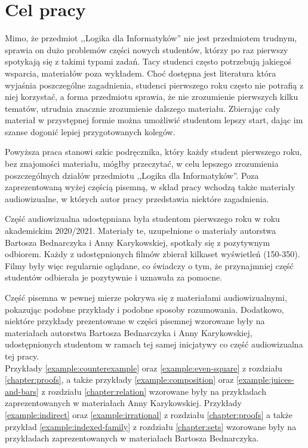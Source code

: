 \section{Cel pracy}
Mimo, że przedmiot ,,Logika dla Informatyków'' nie jest przedmiotem trudnym, sprawia on dużo problemów części nowych studentów, którzy po raz pierwszy spotykają się z takimi typami zadań. Tacy studenci często potrzebują jakiegoś wsparcia, materiałów poza wykładem. Choć dostępna jest literatura która wyjaśnia poszczególne zagadnienia, studenci pierwszego roku często nie potrafią z niej korzystać, a forma przedmiotu sprawia, że nie zrozumienie pierwszych kilku tematów, utrudnia znacznie zrozumienie dalszego materiału. Zbierając cały materiał w przystępnej formie można umożliwić studentom lepszy start, dając im szanse dogonić lepiej przygotowanych kolegów.

Powyższa praca stanowi szkic podręcznika, który każdy student pierwszego roku, bez znajomości materiału, mógłby przeczytać, w celu lepszego zrozumienia poszczególnych działów przedmiotu ,,Logika dla Informatyków''. Poza zaprezentowaną wyżej częścią pisemną, w skład pracy wchodzą także materiały audiowizualne, w których autor pracy przedstawia niektóre zagadnienia. 

Część audiowizualna udostępniana była studentom pierwszego roku w roku akademickim 2020/2021. Materiały te, uzupełnione o materiały autorstwa Bartosza Bednarczyka i Anny Karykowskiej, spotkały się z pozytywnym odbiorem. Każdy z udostępnionych filmów zbierał kilkaset wyświetleń (150-350). Filmy były więc regularnie oglądane, co świadczy o tym, że przynajmniej część studentów odbierała je pozytywnie i uznawała za pomocne.

Część pisemna w pewnej mierze pokrywa się z materiałami audiowizualnymi, pokazując podobne przykłady i podobne sposoby rozumowania. Dodatkowo, niektóre przykłady prezentowane w części pisemnej wzorowane były na materiałach autorstwa Bartosza Bednarczyka i Anny Karykowskiej, udostępnionych studentom w ramach tej samej inicjatywy co część audiowizualna tej pracy.\\
Przykłady \ref{example:counterexample} oraz \ref{example:even-square} z rozdziału \ref{chapter:proofs}, a także przykłady \ref{example:composition} oraz \ref{example:juices-and-bars} z rozdziału \ref{chapter:relation} wzorowane były na przykładach zaprezentowanych w materiałach Anny Karykowskiej. Przykłady \ref{example:indirect} oraz \ref{example:irrational} z rozdziału \ref{chapter:proofs} a także przykład \ref{example:indexed-family} z rozdziału \ref{chapter:sets} wzorowane były na przykładach zaprezentowanych w materiałach Bartosza Bednarczyka.

